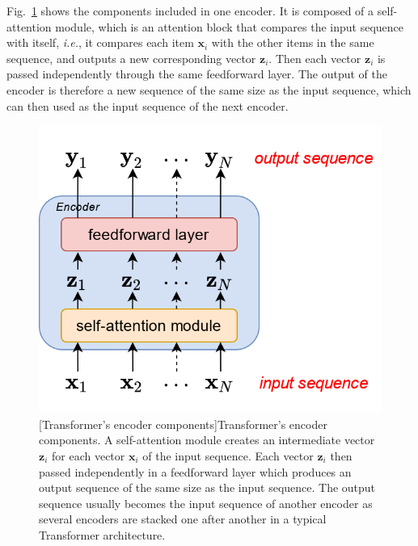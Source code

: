 Fig.~\ref{fig:transformerEncoder} shows the components included in one encoder. It is composed of a self-attention module, which is an attention block that compares the input sequence with itself, \emph{i.e.}, it compares each item $\mathbf{x}_i$ with the other items in the same sequence, and outputs a new corresponding vector $\mathbf{z}_i$. Then each vector $\mathbf{z}_i$ is passed independently through the same feedforward layer. The output of the encoder is therefore a new sequence of the same size as the input sequence, which can then used as the input sequence of the next encoder. 

\begin{figure}[t]
    \begin{center}
    \includegraphics[width=0.6\linewidth]{Images/chap3/transformerEncoder.png}
    [Transformer's encoder components]{Transformer's encoder components. A self-attention module creates an intermediate vector $\mathbf{z}_i$ for each vector $\mathbf{x}_i$ of the input sequence. Each vector $\mathbf{z}_i$ then passed independently in a feedforward layer which produces an output sequence of the same size as the input sequence. The output sequence usually becomes the input sequence of another encoder as several encoders are stacked one after another in a typical Transformer architecture.}
    \label{fig:transformerEncoder}
    \end{center}
\end{figure}


